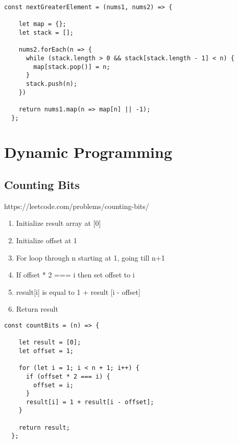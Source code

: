 \documentclass[10pt]{article}
\begin{document}
\begin{lstlisting}[title=Solution nextGreaterElement, captionpos=t]
const nextGreaterElement = (nums1, nums2) => {
    
    let map = {};
    let stack = [];
      
    nums2.forEach(n => {
      while (stack.length > 0 && stack[stack.length - 1] < n) {
        map[stack.pop()] = n;
      }
      stack.push(n);
    })
      
    return nums1.map(n => map[n] || -1);
  };
\end{lstlisting}

\medskip %













\pagebreak
\section{Dynamic Programming}



\medskip   
\subsection{Counting Bits}
https://leetcode.com/problems/counting-bits/

\begin{enumerate}
	\item Initialize result array at [0]
	\item Initialize offset at 1
	\item For loop through n starting at 1, going till n+1
	\item If offset * 2 === i then set offset to i 
	\item result[i] is equal to 1 + result [i - offset]
	\item Return result
\end{enumerate}

\begin{lstlisting}[title=Solution countBits, captionpos=t]
const countBits = (n) => {
    
    let result = [0];
    let offset = 1;
      
    for (let i = 1; i < n + 1; i++) {
      if (offset * 2 === i) {
        offset = i;
      }
      result[i] = 1 + result[i - offset];
    }
  
    return result;
  };
  \end{lstlisting}
\end{document}
